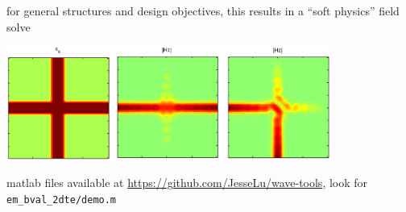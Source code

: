 \documentclass[landscape]{foils}
\begin{document}
\BIT
\item for general structures and design objectives, this results in a ``soft physics'' field solve
\begin{center}
\includegraphics[width=0.8\textwidth]{../figures/crossbar.png}
\end{center}
\item matlab files available at \url{https://github.com/JesseLu/wave-tools}, look for \texttt{em\_bval\_2dte/demo.m}
\EIT
\newpage

\BIT
\item
\EIT
\end{document}
